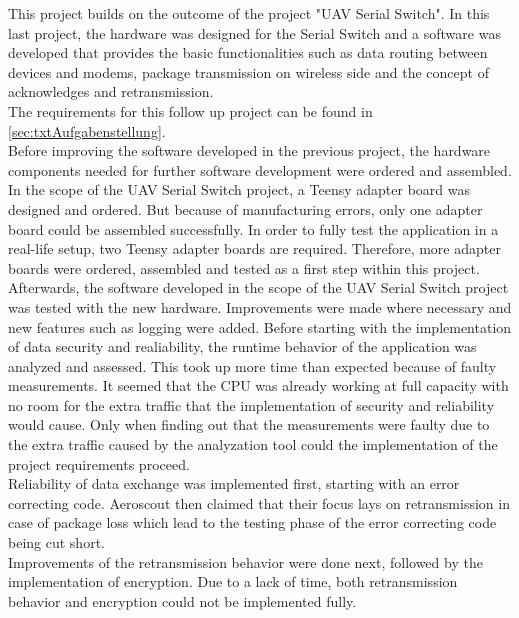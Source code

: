 %
This project builds on the outcome of the project "UAV Serial Switch". In this last project, the hardware was designed for the Serial Switch and a software was developed that provides the basic functionalities such as data routing between devices and modems, package transmission on wireless side and the concept of acknowledges and retransmission.\\
The requirements for this follow up project can be found in \autoref{sec:txtAufgabenstellung}.\\
Before improving the software developed in the previous project, the hardware components needed for further software development were ordered and assembled. In the scope of the UAV Serial Switch project, a Teensy adapter board was designed and ordered. But because of manufacturing errors, only one adapter board could be assembled successfully. In order to fully test the application in a real-life setup, two Teensy adapter boards are required. Therefore, more adapter boards were ordered, assembled and tested as a first step within this project.\\
Afterwards, the software developed in the scope of the UAV Serial Switch project was tested with the new hardware. Improvements were made where necessary and new features such as logging were added. Before starting with the implementation of data security and realiability, the runtime behavior of the application was analyzed and assessed. This took up more time than expected because of faulty measurements. It seemed that the CPU was already working at full capacity with no room for the extra traffic that the implementation of security and reliability would cause. Only when finding out that the measurements were faulty due to the extra traffic caused by the analyzation tool could the implementation of the project requirements proceed.\\
Reliability of data exchange was implemented first, starting with an error correcting code. Aeroscout then claimed that their focus lays on retransmission in case of package loss which lead to the testing phase of the error correcting code being cut short.\\
Improvements of the retransmission behavior were done next, followed by the implementation of encryption. Due to a lack of time, both retransmission behavior and encryption could not be implemented fully.\\
